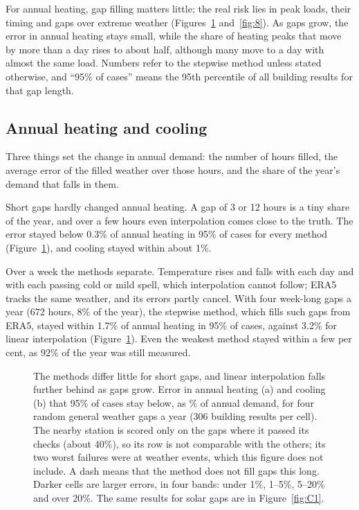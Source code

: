 For annual heating, gap filling matters little; the real risk lies in peak loads, their timing and gaps over extreme weather (Figures~\ref{fig:7} and~\ref{fig:8}). As gaps grow, the error in annual heating stays small, while the share of heating peaks that move by more than a day rises to about half, although many move to a day with almost the same load. Numbers refer to the stepwise method unless stated otherwise, and ``95\% of cases'' means the 95th percentile of all building results for that gap length.

\subsection{Annual heating and cooling}\label{sec:5.1}

Three things set the change in annual demand: the number of hours filled, the average error of the filled weather over those hours, and the share of the year's demand that falls in them.

Short gaps hardly changed annual heating. A gap of 3 or 12 hours is a tiny share of the year, and over a few hours even interpolation comes close to the truth. The error stayed below 0.3\% of annual heating in 95\% of cases for every method (Figure~\ref{fig:7}), and cooling stayed within about 1\%.

Over a week the methods separate. Temperature rises and falls with each day and with each passing cold or mild spell, which interpolation cannot follow; ERA5 tracks the same weather, and its errors partly cancel. With four week-long gaps a year (672 hours, 8\% of the year), the stepwise method, which fills such gaps from ERA5, stayed within 1.7\% of annual heating in 95\% of cases, against 3.2\% for linear interpolation (Figure~\ref{fig:7}). Even the weakest method stayed within a few per cent, as 92\% of the year was still measured.

\begin{figure}[tbp]
\centering
{}
\caption{The methods differ little for short gaps, and linear interpolation falls further behind as gaps grow. Error in annual heating (a) and cooling (b) that 95\% of cases stay below, as \% of annual demand, for four random general weather gaps a year (306 building results per cell). The nearby station is scored only on the gaps where it passed its checks (about 40\%), so its row is not comparable with the others; its two worst failures were at weather events, which this figure does not include. A dash means that the method does not fill gaps this long. Darker cells are larger errors, in four bands: under 1\%, 1--5\%, 5--20\% and over 20\%. The same results for solar gaps are in Figure~\ref{fig:C1}.}
\label{fig:7}
\end{figure}

